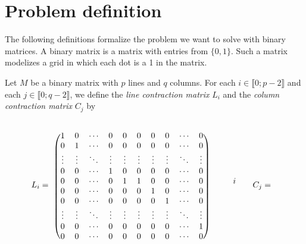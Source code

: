 \section{Problem definition}

The following definitions formalize the problem we want to solve with binary matrices. A binary matrix is a matrix with entries from $\{0,1\}$. Such a matrix modelizes a grid in which each dot is a 1 in the matrix.

\begin{definition}
Let $M$ be a binary matrix with $p$ lines and $q$ columns. For each $i \in \llbracket 0; p-2 \rrbracket$ and each $j \in \llbracket 0; q-2 \rrbracket$, we define the \emph{line contraction matrix} $L_i$ and the \emph{column contraction matrix} $C_j$ by 

$$L_i = \hspace{0.2cm}\begin{blockarray}{ccccccccccccc}
& & & & & & & & & & &\\
\begin{block}{(cccccccccc)ccc}
1      &  0     & \cdots & 0      & 0 & 0 &  0  & 0 & \cdots & 0 &&&\\
0      &  1     & \cdots & 0      & 0 & 0 &  0  & 0 & \cdots & 0 &&&\\
\vdots & \vdots & \ddots & \vdots & \vdots & \vdots &  \vdots  & \vdots & \ddots  & \vdots  &&&\\
0      &   0    &\cdots  & 1      & 0 & 0 &  0  & 0 & \cdots & 0 &&&\\ 
0      &   0    &\cdots  & 0      & 1 & 1 &  0  & 0 & \cdots & 0 & && i\\ 
0      &   0    &\cdots  & 0      & 0 & 0 &  1  & 0 & \cdots & 0 &&&\\
0      &   0    &\cdots  & 0      & 0 & 0 &  0  & 1 & \cdots & 0 &&&\\ 
\vdots      &   \vdots    &\ddots  & \vdots     & \vdots & \vdots & \vdots & \vdots & \ddots & \vdots  &&&\\
0      &   0    &\cdots  & 0      & 0 & 0  &  0 & 0 & \cdots & 1 &&&\\
0      &   0    &\cdots  & 0      & 0 & 0      &   0    & 0      &\cdots  & 0 &&&\\
\end{block}
\end{blockarray}
\hspace{0.5cm}
C_j = \hspace{0.2cm}\begin{blockarray}{ccccccccccc}

\end{blockarray}$$
\end{definition}
